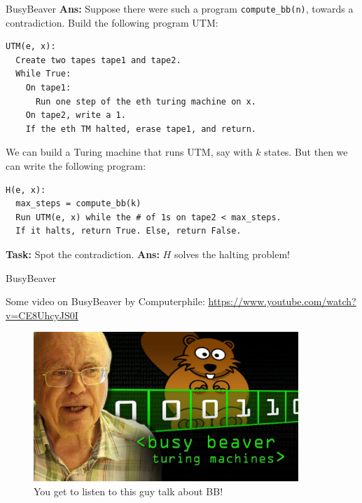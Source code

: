 \documentclass{beamer}
\begin{document}
\begin{frame}[fragile]{BusyBeaver}
\textbf{Ans:} Suppose there were such a program \texttt{compute\_bb(n)}, towards a contradiction. Build the following program UTM:

\begin{verbatim}
UTM(e, x):
  Create two tapes tape1 and tape2.
  While True:
    On tape1:
      Run one step of the eth turing machine on x. 
    On tape2, write a 1.
    If the eth TM halted, erase tape1, and return.
\end{verbatim}

We can build a Turing machine that runs UTM, say with $k$ states. But then we can write the following program:
\begin{verbatim}
H(e, x):
  max_steps = compute_bb(k)
  Run UTM(e, x) while the # of 1s on tape2 < max_steps.
  If it halts, return True. Else, return False.
\end{verbatim}

\textbf{Task:} Spot the contradiction. \pause \textbf{Ans:} $H$ solves the halting problem!

\end{frame}


\begin{frame}{BusyBeaver}

Some video on BusyBeaver by Computerphile:
\url{https://www.youtube.com/watch?v=CE8UhcyJS0I}

\begin{figure}
    \centering
    \includegraphics[width=10cm]{img/computerphile.jpg}
    \caption*{You get to listen to this guy talk about BB!}
\end{figure}

\end{frame}
\end{document}
